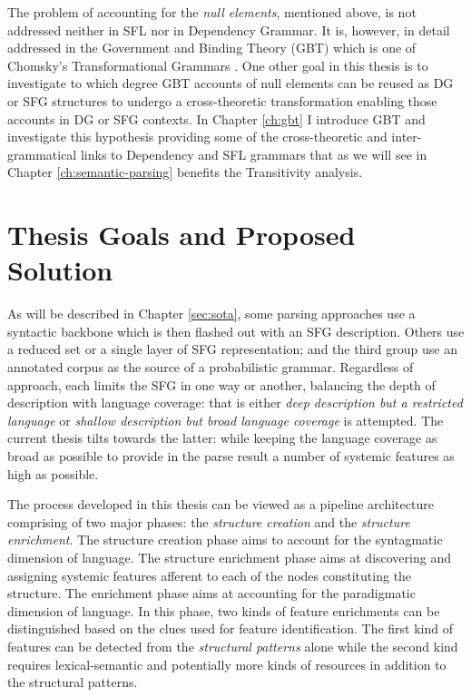 The problem of accounting for the \textit{null elements}, mentioned above, is not addressed neither in SFL nor in Dependency Grammar. It is, however, in detail addressed in the Government and Binding Theory (GBT) \citep{Chomsky81,Haegeman1991} which is one of Chomsky's Transformational Grammars \citep{Chomsky1957}. One other goal in this thesis is to investigate to which degree GBT accounts of null elements can be reused as DG or SFG structures to undergo a cross-theoretic transformation enabling those accounts in DG or SFG contexts. In Chapter \ref{ch:gbt} I introduce GBT and investigate this hypothesis providing some of the cross-theoretic and inter-grammatical links to Dependency and SFL grammars that as we will see in Chapter \ref{ch:semantic-parsing} benefits the Transitivity analysis.


\section{Thesis Goals and Proposed Solution}
\label{sec:solution}

As will be described in Chapter \ref{sec:sota}, some parsing approaches use a syntactic backbone which is then flashed out with an SFG description. Others use a reduced set or a single layer of SFG representation; and the third group use an annotated corpus as the source of a probabilistic grammar. Regardless of approach, each limits the SFG in one way or another, balancing the depth of description with language coverage: that is either \textit{deep description but a restricted language} or \textit{shallow description but broad language coverage} is attempted. The current thesis tilts towards the latter: while keeping the language coverage as broad as possible  to provide in the parse result a number of systemic features as high as possible.

The process developed in this thesis can be viewed as a pipeline architecture comprising of two major phases: the \textit{structure creation} and the \textit{structure enrichment}. The structure creation phase aims to account for the syntagmatic dimension of language. The structure enrichment phase aims at discovering and assigning systemic features afferent to each of the nodes constituting the structure. The enrichment phase aims at accounting for the paradigmatic dimension of language. In this phase, two kinds of feature enrichments can be distinguished based on the clues used for feature identification. The first kind of features can be detected from the \textit{structural patterns} alone while the second kind requires lexical-semantic and potentially more kinds of resources in addition to the structural patterns.

